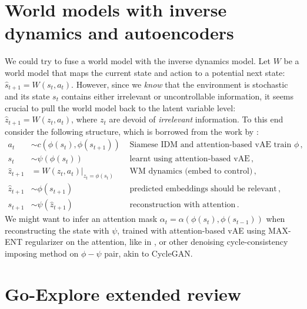 \documentclass[acmsmall, nonacm]{acmart}
\begin{document}

\section{World models with inverse dynamics and autoencoders} %
\label{sec:wm_idm_ae}

We could try to fuse a world model with the inverse dynamics model. Let $W$ be a
world model that maps the current state and action to a potential next state: $
    \hat{s}_{t+1} = W(s_t, a_t)
$. However, since we \emph{know} that the environment is stochastic and its state
$s_t$ contains either irrelevant or uncontrollable information, it seems crucial to
pull the world model back to the latent variable level: $
    \hat{z}_{t+1} = W(z_t, a_t)
$, where $z_t$ are devoid of \emph{irrelevant} information. To this end consider
the following structure, which is borrowed from the work by \citet{watter_embed_2015}:
\begin{align*}
    a_t &\sim c(\phi(s_t), \phi(s_{t+1}))
        &\text{ Siamese IDM and attention-based vAE train } \phi
    \,, \\
    s_t &\sim \psi(\phi(s_t))
        &\text{ learnt using attention-based vAE}
    \,, \\
    \hat{z}_{t+1}
        &= W(z_t, a_t) \big\vert_{z_t = \phi(s_t)}
        &\text{ WM dynamics (embed to control)}
    \,, \\
    \hat{z}_{t+1}
        &\sim \phi(s_{t+1})
        &\text{ predicted embeddings should be relevant}
    \,, \\
    s_{t+1}
        &\sim \psi(\hat{z}_{t+1})
        &\text{ reconstruction with attention}
    \,.
\end{align*}
We might want to infer an attention mask $\alpha_t = \alpha(\phi(s_t), \phi(s_{t-1}))$
when reconstructing the state with $\psi$, trained with attention-based vAE using
MAX-ENT regularizer on the attention, like in \citep{choi_contingency-aware_2019},
or other denoising cycle-consistency imposing method on $\phi-\psi$ pair, akin to
CycleGAN.



\section{Go-Explore extended review}
\end{document}
